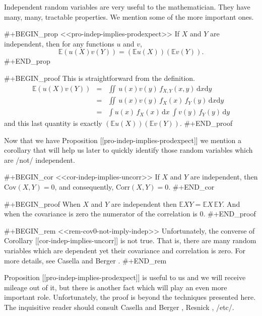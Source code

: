 Independent random variables are very useful to the
mathematician. They have many, many, tractable properties. We mention
some of the more important ones.

#+BEGIN_prop
<<pro-indep-implies-prodexpect>> If \(X\) and \(Y\) are independent,
then for any functions \(u\) and \(v\),
\begin{equation}
\mathbb{E}\left(u(X)v(Y)\right)=\left(\mathbb{E} u(X)\right)\left(\mathbb{E} v(Y)\right).
\end{equation}
#+END_prop

#+BEGIN_proof
This is straightforward from the definition.
\begin{eqnarray*}
\mathbb{E}\left(u(X)v(Y)\right) & = & \iint\, u(x)v(y)\, f_{X,Y}(x,y)\,\mathrm{d} x\mathrm{d} y\\
 & = & \iint\, u(x)v(y)\, f_{X}(x)\, f_{Y}(y)\,\mathrm{d} x\mathrm{d} y\\
 & = & \int u(x)\, f_{X}(x)\,\mathrm{d} x\ \int v(y)\, f_{Y}(y)\,\mathrm{d} y
\end{eqnarray*}
and this last quantity is exactly \(\left(\mathbb{E} u(X)\right)\left(\mathbb{E} v(Y)\right)\). 
#+END_proof

Now that we have Proposition [[pro-indep-implies-prodexpect]] we mention a
corollary that will help us later to quickly identify those random
variables which are /not/ independent.

#+BEGIN_cor
<<cor-indep-implies-uncorr>> If \(X\) and \(Y\) are independent, then
\(\mbox{Cov}(X,Y)=0\), and consequently, \(\mbox{Corr}(X,Y)=0\).
#+END_cor

#+BEGIN_proof
When \(X\) and \(Y\) are independent then \(\mathbb{E} XY=\mathbb{E}
X\,\mathbb{E} Y\). And when the covariance is zero the numerator of
the correlation is 0.
#+END_proof

#+BEGIN_rem
<<rem-cov0-not-imply-indep>> Unfortunately, the converse of Corollary
[[cor-indep-implies-uncorr]] is not true. That is, there are many random
variables which are dependent yet their covariance and correlation is
zero. For more details, see Casella and Berger \cite{Casella2002}.
#+END_rem

Proposition [[pro-indep-implies-prodexpect]] is useful to us and we will
receive mileage out of it, but there is another fact which will play
an even more important role. Unfortunately, the proof is beyond the
techniques presented here. The inquisitive reader should consult
Casella and Berger \cite{Casella2002}, Resnick \cite{Resnick1999},
/etc/.

